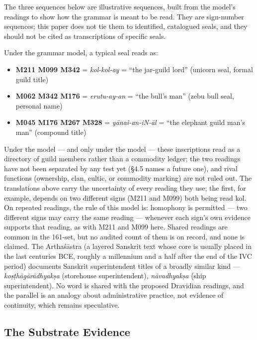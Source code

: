 \documentclass[11pt]{article}
\providecommand{\tightlist}{%
  \setlength{\itemsep}{0pt}\setlength{\parskip}{0pt}}
\newcounter{none} %
\begin{document}
The three sequences below are illustrative sequences, built from the model's readings to show how the grammar is meant to be read. They are sign-number sequences; this paper does not tie them to identified, catalogued seals, and they should not be cited as transcriptions of specific seals.

Under the grammar model, a typical seal reads as:

\begin{itemize}
\tightlist
\item
  \textbf{M211 M099 M342} = \emph{kol-kol-ay} = ``the jar-guild lord''
  (unicorn seal, formal guild title)
\item
  \textbf{M062 M342 M176} = \emph{erutu-ay-an} = ``the bull's man''
  (zebu bull seal, personal name)
\item
  \textbf{M045 M176 M267 M328} = \emph{yānai-an-iN-āl} = ``the elephant
  guild man's man'' (compound title)
\end{itemize}

Under the model --- and only under the model --- these inscriptions read as a directory of guild members rather than a commodity ledger; the two readings have not been separated by any test yet (§4.5 names a future one), and rival functions (ownership, clan, cultic, or commodity marking) are not ruled out. The translations above carry the uncertainty of every reading they use; the first, for example, depends on two different signs (M211 and M099) both being read kol. On repeated readings, the rule of this model is: homophony is permitted --- two different signs may carry the same reading --- whenever each sign's own evidence supports that reading, as with M211 and M099 here. Shared readings are common in the 161-set, but no audited count of them is on record, and none is claimed. The Arthaśāstra (a layered Sanskrit text whose core is usually placed in the last centuries BCE, roughly a millennium and a half after the end of the IVC period) documents Sanskrit superintendent titles of a broadly similar kind --- \emph{koṣṭhāgārādhyakṣa} (storehouse superintendent), \emph{nāvadhyakṣa} (ship superintendent). No word is shared with the proposed Dravidian readings, and the parallel is an analogy about administrative practice, not evidence of continuity, which remains speculative.

\subsection{The Substrate Evidence}\label{the-substrate-evidence}
\end{document}
